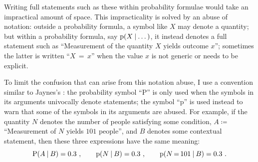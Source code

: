 \documentclass[\ifafour a4paper,12pt,\else a5paper,10pt,\fi%
onecolumn,oneside,article,%
british%
]{memoir}
\theoremstyle{remark}
\theoremstyle{innote}
\newcommand*{\defd}{\coloneqq}
\newcommand*{\p}{\mathrm{p}}%
\renewcommand*{\P}{\mathrm{P}}%
\renewcommand*{\|}[1][]{\nonscript\:#1\vert\nonscript\:\mathopen{}}
\newcommand*{\mo}[1][=]{\mathord{\,#1\,}}
\newcommand*{\sect}{\S}%
\newcommand*{\prop}[1]{\enquote{\textsf{#1}}}%
\begin{document}
Writing full statements such as these within probability formulae would take an impractical amount of space. This impracticality is solved by an abuse of notation: outside a probability formula, a symbol like $X$ may denote a quantity; but within a probability formula, say $\p(X \| \dotso)$, it instead denotes a full statement such as \prop{Measurement of the quantity $X$ yields outcome $x$}; sometimes the latter is written \prop{$X\mo x$} when the value $x$ is not generic or needs to be explicit.

To limit the confusion that can arise from this notation abuse, I use a convention similar to Jaynes's \parencites*[\sect\,2.5 p.~43]{jaynes1994_r2003}: the probability symbol \enquote{$\P$} is only used when the symbols in its arguments univocally denote statements; the symbol \enquote{$\p$} is used instead to warn that some of the symbols in its arguments are abused. For example, if the quantity $N$ denotes the number of people satisfying some condition, $A\defd{}$\prop{Measurement of $N$ yields $101$ people}, and $B$ denotes some contextual statement, then these three expressions have the same meaning:
\begin{equation*}
  \P(A\|B) = 0.3 \ , \qquad
  \p(N \| B) = 0.3 \ ,\qquad
  \p(N\mo 101 \| B) = 0.3 \ .
\end{equation*}
\end{document}
